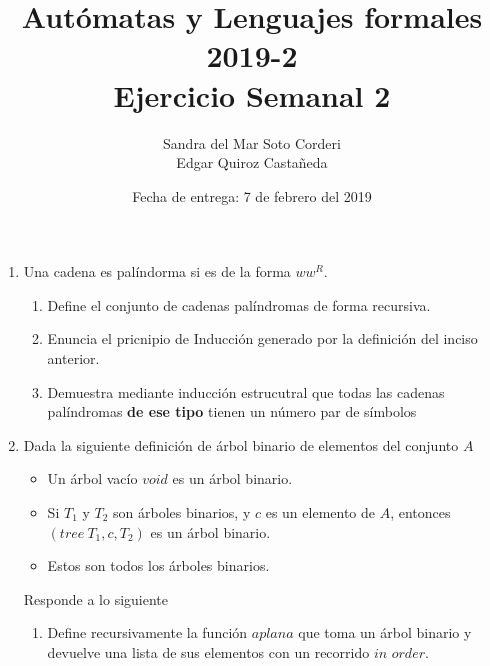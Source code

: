 \documentclass{article}
\begin{document}
    
    \title{Autómatas y Lenguajes formales 2019-2\\
    \large Ejercicio Semanal 2}

    \date{Fecha de entrega: 7 de febrero del 2019}

    \author{Sandra del Mar Soto Corderi\\
    Edgar Quiroz Castañeda}

    \maketitle


    \begin{enumerate}
        \item {
            Una cadena es palíndorma si es de la forma $ww^R$.
            \begin{enumerate}
                \item {
                    Define el conjunto de cadenas palíndromas de forma recursiva.
                }
                \item {
                    Enuncia el pricnipio de Inducción generado por la definición
                    del inciso anterior.
                }
                \item {
                    Demuestra mediante inducción estrucutral que todas las 
                    cadenas palíndromas \textbf{de ese tipo} tienen un número 
                    par de símbolos
                }
                
            \end{enumerate}
        }
        \item {
            Dada la siguiente definición de árbol binario de elementos del 
            conjunto $A$
            \begin{itemize}
                \item {
                    Un árbol vacío $void$ es un árbol binario.
                }
                \item {
                    Si $T_1$ y $T_2$ son árboles binarios, y $c$ es un elemento 
                    de $A$, entonces $(tree \ T_1, c, T_2)$ es un árbol binario.
                }
                \item {
                    Estos son todos los árboles binarios.
                }
            \end{itemize}
            Responde a lo siguiente
            \begin{enumerate}
                \item {
                    Define recursivamente la función $aplana$ que toma
                    un árbol binario y devuelve una lista de sus elementos con 
                    un recorrido $\textit{in order}$.\\
		            
}
\end{enumerate}}
\end{enumerate}
\end{document}
